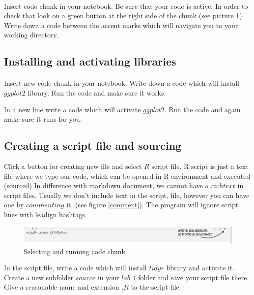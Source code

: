 \documentclass{article}\usepackage[]{graphicx}\usepackage[]{color}
\begin{document}
\paragraph{}
Insert code chunk in your notebook. Be sure that your code is active. In order to check that look on a green button at the right side of the chunk (see picture \ref{chunk}). Write down a code between the accent marks which will navigate you to your working directory.


\subsection*{Installing and activating libraries}
\paragraph{}
Insert new code chunk in your notebook. Write down a code which will install $ggplot2$ library. Run the code and make sure it works.

In a new line write a code which will activate $ggplot2$. Run the code and again make sure it runs for you.


\subsection*{Creating a script file and sourcing}

Click a button for creating new file and select $R$ script file. R script is just a text file where we type our code, which can be opened in R environment and executed (sourced) In difference with markdown document, we cannot have a $rich text$ in script files. Usually we don't include text in the script, file, however you can have one by $commenting$ it. (see figure \ref{comment}). The program will ignore script lines with leadign hashtags.

\begin{figure}[h]
\centering
\includegraphics[width=\textwidth]{img/run_chunk.PNG}
\caption{Selecting and running code chunk}
    \label{chunk}
\end{figure}

In the script file, write a code which will install $tidyr$ library and activate it. Create a new subfolder $source$ in your $lab\_1$ folder and save your script file there. Give a reasonable name and extension $.R$ to the script file.
\end{document}
